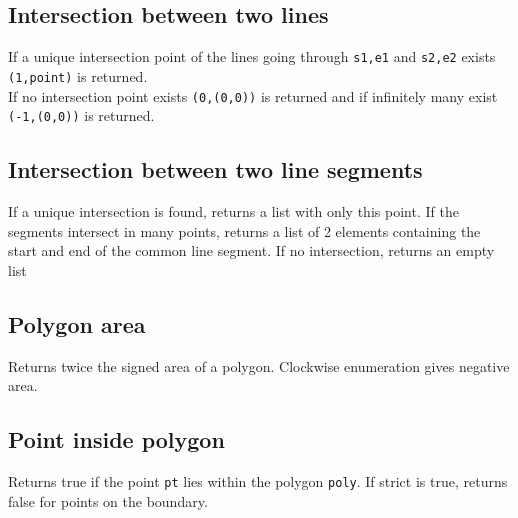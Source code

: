 \documentclass{article}
\begin{document}
\subsection*{Intersection between two lines}
If a unique intersection point of the lines going through \lstinline{s1,e1} and \lstinline{s2,e2} exists \lstinline{(1,point)} is returned.\\
If no intersection point exists \lstinline{(0,(0,0))} is returned and if infinitely many exist \lstinline{(-1,(0,0))} is returned.
\begin{multicols}{2}
  
  \columnbreak
  
\end{multicols}

\subsection*{Intersection between two line segments}
If a unique intersection is found, returns a list with only this point.
If the segments intersect in many points, returns a list of 2 elements containing the
start and end of the common line segment. If no intersection, returns an empty list

\begin{multicols}{2}
  
  \columnbreak
  
\end{multicols}

\subsection*{Polygon area}
Returns twice the signed area of a polygon. Clockwise enumeration gives negative area.
\begin{multicols}{2}
  
  \columnbreak
  
\end{multicols}

\pagebreak

\subsection*{Point inside polygon}
Returns true if the point \lstinline{pt} lies within the polygon \lstinline{poly}.
If strict is true, returns false for points on the boundary.


\end{document}
